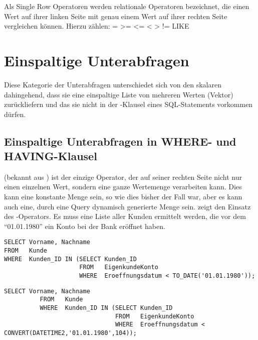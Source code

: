\begin{merke}
    Als Single Row Operatoren werden relationale Operatoren bezeichnet, die einen Wert auf ihrer linken Seite mit genau einem Wert auf ihrer rechten Seite vergleichen können. Hierzu zählen: = >= <= < > != LIKE
\end{merke}
\section{Einspaltige Unterabfragen}
Diese Kategorie der Unterabfragen unterschiedet sich von den skalaren dahingehend, dass sie eine einspaltige Liste von mehreren Werten (Vektor) zurückliefern und das sie nicht in der \SELECT-Klausel eines SQL-Statements vorkommen dürfen.
\subsection{Einspaltige Unterabfragen in WHERE- und HAVING-Klausel}
 (bekannt aus ) ist der einzige Operator, der auf seiner rechten Seite nicht nur einen einzelnen Wert, sondern eine ganze Wertemenge verarbeiten kann. Dies kann eine konstante Menge sein, so wie dies bisher der Fall war, aber es kann auch eine, durch eine Query dynamisch generierte Menge sein.  zeigt den Einsatz des -Operators. Es muss eine Liste aller Kunden ermittelt werden, die vor dem \enquote{01.01.1980} ein Konto bei der Bank eröffnet haben.
\begin{lstlisting}[language=oracle_sql,caption={\languageorasql{IN} mit Unterabfrage},label=sql06_07]
SELECT Vorname, Nachname
FROM   Kunde
WHERE  Kunden_ID IN (SELECT Kunden_ID
                     FROM   EigenkundeKonto
                     WHERE  Eroeffnungsdatum < TO_DATE('01.01.1980'));
        \end{lstlisting}
        \begin{lstlisting}[language=ms_sql,caption={Die Fehlermeldung in SQL Server},label=sql05_04]
          SELECT Vorname, Nachname
          FROM   Kunde
          WHERE  Kunden_ID IN (SELECT Kunden_ID
                               FROM   EigenkundeKonto
                               WHERE  Eroeffnungsdatum < CONVERT(DATETIME2,'01.01.1980',104));
                  \end{lstlisting}

